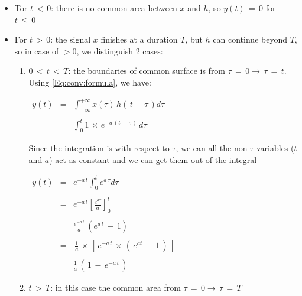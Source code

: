 \begin{itemize}

\item Tor $t \, < \, 0$: there is no common area between $x$ and $h$, so $y(t) \, = \, 0$ for $t \, \leq \, 0$

\item  For $t \, > \, 0$:  the signal $x$ finishes at a duration $T$, but $h$ can continue beyond $T$, so in case of $>0$, we distinguish 2 cases: 

    \begin{enumerate}
    \item $0 \,<\, t \, < \, T$:  the boundaries of common surface is from $\tau \, = \, 0 \rightarrow \, \tau \, = \, t$. Using \autoref{Eq:conv:formula}, we have:


$\begin{array}{rcl}
     y(t) &=& \displaystyle \int_{-\infty}^{+\infty} x(\tau) \, h\left(\,t \, - \tau\, \right) d \tau  \\ \\
      &=& \displaystyle \int_{0}^{t} 1 \, \times \, e^{-a \, (t \, - \, \tau)} \, d \tau
\end{array}$

Since the integration is with respect to $\tau$, we can all the non $\tau$ variables ($t$ and $a$) act as constant and we can get them out of the integral

\newpage
$\begin{array}{rcl}
 y(t) &=& e^{-a \, t} \displaystyle \int_{0}^{t} e^{a \, \tau} d\tau \,   \\ \\
    &=& e^{-a \, t}  \left[ \displaystyle\frac{e^{a\tau}}{a} \right]_{0}^{t} \\ \\ 
    &=& \displaystyle\frac{e^{-a \, t}}{a} \, (e^{a \, t} \, - \, 1) \\ \\ 
    &=& \, \displaystyle\frac{1}{a} \, \times \, \left[ \,e^{-a \, t} \, \times \, \left( \, e^{at} \, - \, 1 \,\right) \, \right] \\ \\
    &=& \displaystyle\frac{1}{a} \, \left(\, 1 \, - \, e^{-a \, t}   \, \right)    
\end{array} $\\

\item  $t \, > \, T$: in this case the common area from $\tau \, = \, 0 \rightarrow \, \tau \, = \, T$


\end{enumerate}
\end{itemize}
